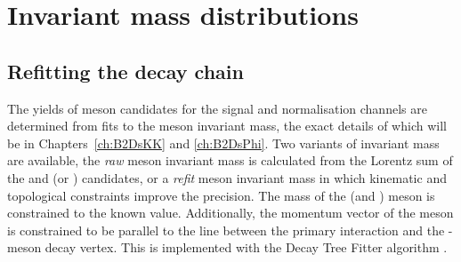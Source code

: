 


\section{Invariant mass distributions}
\label{sec:invarinantmassdistros}

\subsection{Refitting the decay chain}
\label{sec:decaytreefitter}

The yields of \Bp meson candidates for the signal and normalisation channels are determined from fits to the \Bp meson invariant mass, the exact details of which will be in Chapters~\ref{ch:B2DsKK} and \ref{ch:B2DsPhi}.
Two variants of invariant mass are available, the \emph{raw} \Bp meson invariant mass is calculated from the Lorentz sum of the \Dsp and \phiz (or \Dzb) candidates, or a \emph{refit} \Bp meson invariant mass in which kinematic and topological constraints improve the precision. The mass of the \Dsp (and \Dzb) meson is constrained to the known value. Additionally, the momentum vector of the \Bp meson is constrained to be parallel to the line between the primary interaction and the \Bp-meson decay vertex. 
This is implemented with the Decay Tree Fitter algorithm \cite{Hulsbergen:2005pu}. 



